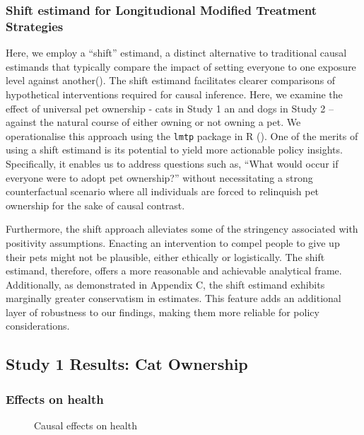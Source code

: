 \documentclass[
  singlecolumn,
  9pt]{article}
\begin{document}
\subsubsection{Shift estimand for Longitudional Modified Treatment
Strategies}\label{shift-estimand-for-longitudional-modified-treatment-strategies}

Here, we employ a ``shift'' estimand, a distinct alternative to
traditional causal estimands that typically compare the impact of
setting everyone to one exposure level against
another(). The shift
estimand facilitates clearer comparisons of hypothetical interventions
required for causal inference. Here, we examine the effect of universal
pet ownership - cats in Study 1 an and dogs in Study 2 -- against the
natural course of either owning or not owning a pet. We operationalise
this approach using the \texttt{lmtp} package in R
(). One of the merits
of using a shift estimand is its potential to yield more actionable
policy insights. Specifically, it enables us to address questions such
as, ``What would occur if everyone were to adopt pet ownership?''
without necessitating a strong counterfactual scenario where all
individuals are forced to relinquish pet ownership for the sake of
causal contrast.

Furthermore, the shift approach alleviates some of the stringency
associated with positivity assumptions. Enacting an intervention to
compel people to give up their pets might not be plausible, either
ethically or logistically. The shift estimand, therefore, offers a more
reasonable and achievable analytical frame. Additionally, as
demonstrated in Appendix C, the shift estimand exhibits marginally
greater conservatism in estimates. This feature adds an additional layer
of robustness to our findings, making them more reliable for policy
considerations.

\newpage{}

\subsection{Study 1 Results: Cat
Ownership}\label{study-1-results-cat-ownership}

\subsubsection{Effects on health}\label{effects-on-health}

\begin{figure}


\caption{\label{fig-results-health-cats}Causal effects on health}

\end{figure}%
\end{document}
